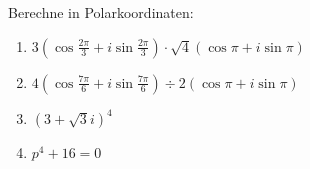 \documentclass[11pt, a4paper]{article}
\newcommand\braces[1]{\left(#1\right)}
\newcommand{\acos}[1]{\mathrm{acos}\braces{#1}}
\newif\ifshowsolution
\begin{document}
Berechne in Polarkoordinaten:
\begin{enumerate}
	\item $3 \braces{\cos \frac{2\pi}{3} + i \sin \frac{2\pi}{3}} \cdot \sqrt{4} \braces{\cos \pi + i \sin \pi}$
	
	\ifshowsolution
		\begin{align*}
			3 \braces{\cos \frac{2\pi}{3} + i \sin \frac{2\pi}{3}} \cdot \sqrt{4} \braces{\cos \pi + i \sin \pi} &= 3 \sqrt{4} \braces{ \cos \braces{\frac{2\pi}{3}+\pi} + i \sin \braces{\frac{2\pi}{3} + \pi} } \\
			&= 6 \braces{ \cos \frac{5\pi}{3} + i \sin \frac{5\pi}{3} }
		\end{align*}
	\fi
		
	\item $4 \braces{ \cos \frac{7\pi}{6} + i \sin \frac{7\pi}{6} } \div 2 \braces{ \cos \pi + i \sin \pi }$
	
	\ifshowsolution
		\begin{align*}
			4 \braces{ \cos \frac{7\pi}{6} + i \sin \frac{7\pi}{6} } \div 2 \braces{ \cos \pi + i \sin \pi } &= \frac{4}{2} \braces{ \cos \braces{\frac{7\pi}{6} - \pi} + i \sin \braces{\frac{7\pi}{6} - \pi} } \\
			&= 2 \braces{\cos \frac{\pi}{6} + i \sin \frac{\pi}{6}}
		\end{align*}
	\fi
		
	\item $\braces{3+\sqrt{3}i}^4$
	
	\ifshowsolution
		$r = \sqrt{3^2 + \sqrt{3}^2} = \sqrt{12}, \quad \alpha = \acos{\frac{3}{\sqrt{12}}} = \acos {\frac{\sqrt{3}}{2}} = \frac{\pi}{6}$ \\
		\begin{align*}
			\braces{3+\sqrt{3}i}^4 &= \braces{ \sqrt{12} \braces{\cos \frac{\pi}{6} + i \sin \frac{\pi}{6}} }^4 \\
			&= \sqrt{12}^4 \braces{ \cos \frac{4\pi}{6} + i \sin \frac{4\pi}{6} } \\
			&= 12^2 \braces{ \cos \frac{2\pi}{3} + i \sin \frac{2\pi}{3} } \\
			&= 12^2 \braces{ - \frac{1}{2} + i \frac{\sqrt{3}}{2} } \\
			&= 72 + 72\sqrt{3}i
		\end{align*}
	\fi
		
	\item $p^4 + 16 = 0$
	

\end{enumerate}
\end{document}
